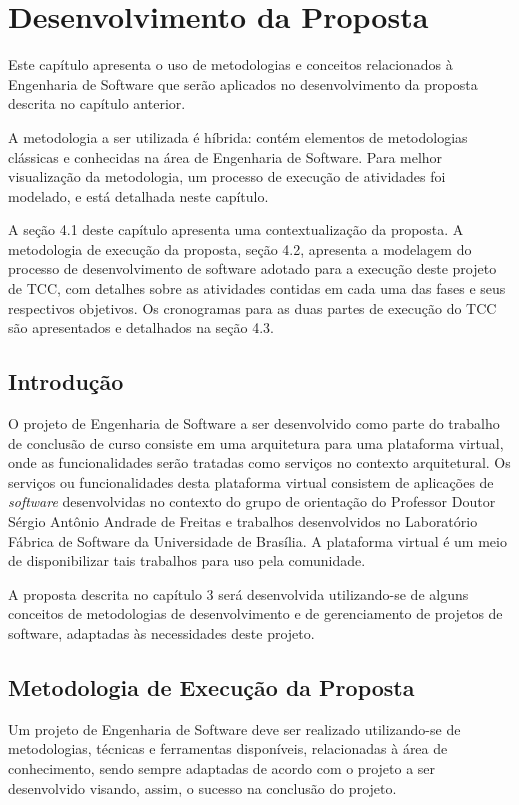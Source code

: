 \chapter[Desenvolvimento da Proposta]{Desenvolvimento da Proposta}

Este capítulo apresenta o uso de metodologias e conceitos relacionados à Engenharia de Software que serão aplicados no desenvolvimento da proposta descrita no capítulo anterior.

A metodologia a ser utilizada é híbrida: contém elementos de metodologias clássicas e conhecidas na área de Engenharia de Software. Para melhor visualização da metodologia, um processo de execução de atividades foi modelado, e está detalhada neste capítulo.

A seção 4.1 deste capítulo apresenta uma contextualização da proposta. A metodologia de execução da proposta, seção 4.2, apresenta a modelagem do processo de desenvolvimento de software adotado para a execução deste projeto de TCC, com detalhes sobre as atividades contidas em cada uma das fases e seus respectivos objetivos. Os cronogramas para as duas partes de execução do TCC são apresentados e detalhados na seção 4.3.

\section{Introdução}
O projeto de Engenharia de Software a ser desenvolvido como parte do trabalho de conclusão de curso consiste em uma arquitetura para uma plataforma virtual, onde as funcionalidades serão tratadas como serviços no contexto arquitetural. Os serviços ou funcionalidades desta plataforma virtual consistem de aplicações de \textit{software} desenvolvidas no contexto do grupo de orientação do Professor Doutor Sérgio Antônio Andrade de Freitas e trabalhos desenvolvidos no Laboratório Fábrica de Software da Universidade de Brasília. A plataforma virtual é um meio de disponibilizar tais trabalhos para uso pela comunidade.

A proposta descrita no capítulo 3 será desenvolvida utilizando-se de alguns conceitos de metodologias de desenvolvimento e de gerenciamento de projetos de software, adaptadas às necessidades deste projeto.

\section{Metodologia de Execução da Proposta}
Um projeto de Engenharia de Software deve ser realizado utilizando-se de metodologias, técnicas e ferramentas disponíveis, relacionadas à área de conhecimento, sendo sempre adaptadas de acordo com o projeto a ser desenvolvido visando, assim, o sucesso na conclusão do projeto.

